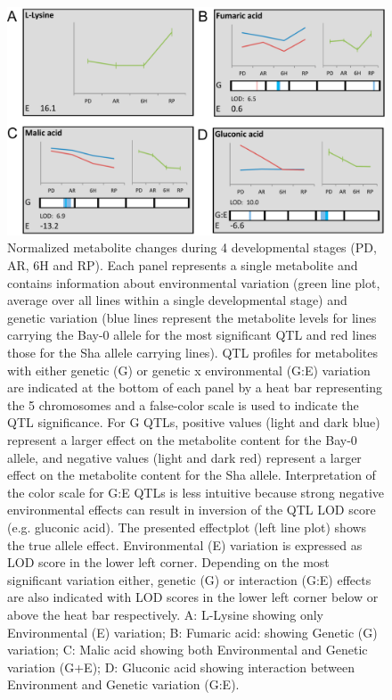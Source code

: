 \begin{figure}[!ht]
  \centering
  \includegraphics[keepaspectratio,scale=0.20]{eps/image_3_2_4.eps}
  \caption[Normalized metabolite changes]{Normalized metabolite changes during 4 developmental stages (PD, 
          AR, 6H and RP). Each panel represents a single metabolite and contains information about environmental 
          variation (green line plot, average over all lines within a single developmental stage) and genetic 
          variation (blue lines represent the metabolite levels for lines carrying the Bay-0 allele for the most 
          significant QTL and red lines those for the Sha allele carrying lines). QTL profiles for metabolites 
          with either genetic (G) or genetic x environmental (G:E) variation are indicated at the bottom of each 
          panel by a heat bar representing the 5 chromosomes and a false-color scale is used to indicate the QTL 
          significance. For G QTLs, positive values (light and dark blue) represent a larger effect on the metabolite 
          content for the Bay-0 allele, and negative values (light and dark red) represent a larger effect on the 
          metabolite content for the Sha allele. Interpretation of the color scale for G:E QTLs is less intuitive 
          because strong negative environmental effects can result in inversion of the QTL LOD score (e.g. gluconic acid). 
          The presented effectplot (left line plot) shows the true allele effect. Environmental (E) variation is 
          expressed as LOD score in the lower left corner. Depending on the most significant variation either, 
          genetic (G) or interaction (G:E) effects are also indicated with LOD scores in the lower left corner below 
          or above the heat bar respectively. A: L-Lysine showing only Environmental (E) variation; B: Fumaric acid: 
          showing Genetic (G) variation; C: Malic acid showing both Environmental and Genetic variation (G+E); D: 
          Gluconic acid showing interaction between Environment and Genetic variation (G:E).}
          \label{fig:normMetabolites}
\end{figure}

